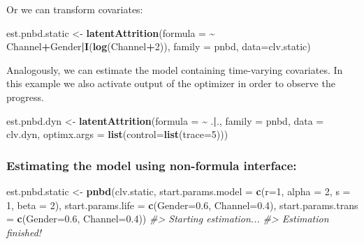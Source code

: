 \documentclass[
]{article}
\newenvironment{Shaded}{\begin{snugshade}}{\end{snugshade}}
\newcommand{\AttributeTok}[1]{\textcolor[rgb]{0.13,0.29,0.53}{#1}}
\newcommand{\CommentTok}[1]{\textcolor[rgb]{0.56,0.35,0.01}{\textit{#1}}}
\newcommand{\DecValTok}[1]{\textcolor[rgb]{0.00,0.00,0.81}{#1}}
\newcommand{\FloatTok}[1]{\textcolor[rgb]{0.00,0.00,0.81}{#1}}
\newcommand{\FunctionTok}[1]{\textcolor[rgb]{0.13,0.29,0.53}{\textbf{#1}}}
\newcommand{\NormalTok}[1]{#1}
\newcommand{\OtherTok}[1]{\textcolor[rgb]{0.56,0.35,0.01}{#1}}
\newcommand{\SpecialCharTok}[1]{\textcolor[rgb]{0.81,0.36,0.00}{\textbf{#1}}}
\begin{document}
Or we can transform covariates:

\begin{Shaded}
\begin{Highlighting}[]
\NormalTok{  est.pnbd.static }\OtherTok{\textless{}{-}} \FunctionTok{latentAttrition}\NormalTok{(}\AttributeTok{formula =} \SpecialCharTok{\textasciitilde{}}\NormalTok{ Channel}\SpecialCharTok{+}\NormalTok{Gender}\SpecialCharTok{|}\FunctionTok{I}\NormalTok{(}\FunctionTok{log}\NormalTok{(Channel}\SpecialCharTok{+}\DecValTok{2}\NormalTok{)), }
                                     \AttributeTok{family =}\NormalTok{ pnbd, }\AttributeTok{data=}\NormalTok{clv.static)}
\end{Highlighting}
\end{Shaded}

Analogously, we can estimate the model containing time-varying
covariates. In this example we also activate output of the optimizer in
order to observe the progress.

\begin{Shaded}
\begin{Highlighting}[]
\NormalTok{est.pnbd.dyn }\OtherTok{\textless{}{-}} \FunctionTok{latentAttrition}\NormalTok{(}\AttributeTok{formula =} \SpecialCharTok{\textasciitilde{}}\NormalTok{ .}\SpecialCharTok{|}\NormalTok{., }\AttributeTok{family =}\NormalTok{ pnbd, }\AttributeTok{data =}\NormalTok{ clv.dyn, }
                                \AttributeTok{optimx.args =} \FunctionTok{list}\NormalTok{(}\AttributeTok{control=}\FunctionTok{list}\NormalTok{(}\AttributeTok{trace=}\DecValTok{5}\NormalTok{)))}
\end{Highlighting}
\end{Shaded}

\subsubsection{\texorpdfstring{\textbf{Estimating the model using
non-formula
interface}:}{Estimating the model using non-formula interface:}}\label{estimating-the-model-using-non-formula-interface-2}

\begin{Shaded}
\begin{Highlighting}[]
\NormalTok{est.pnbd.static }\OtherTok{\textless{}{-}} \FunctionTok{pnbd}\NormalTok{(clv.static, }
                         \AttributeTok{start.params.model =} \FunctionTok{c}\NormalTok{(}\AttributeTok{r=}\DecValTok{1}\NormalTok{, }\AttributeTok{alpha =} \DecValTok{2}\NormalTok{, }\AttributeTok{s =} \DecValTok{1}\NormalTok{, }\AttributeTok{beta =} \DecValTok{2}\NormalTok{),}
                         \AttributeTok{start.params.life =} \FunctionTok{c}\NormalTok{(}\AttributeTok{Gender=}\FloatTok{0.6}\NormalTok{, }\AttributeTok{Channel=}\FloatTok{0.4}\NormalTok{),}
                         \AttributeTok{start.params.trans =} \FunctionTok{c}\NormalTok{(}\AttributeTok{Gender=}\FloatTok{0.6}\NormalTok{, }\AttributeTok{Channel=}\FloatTok{0.4}\NormalTok{))}
\CommentTok{\#\textgreater{} Starting estimation...}
\CommentTok{\#\textgreater{} Estimation finished!}
\end{Highlighting}
\end{Shaded}
\end{document}
